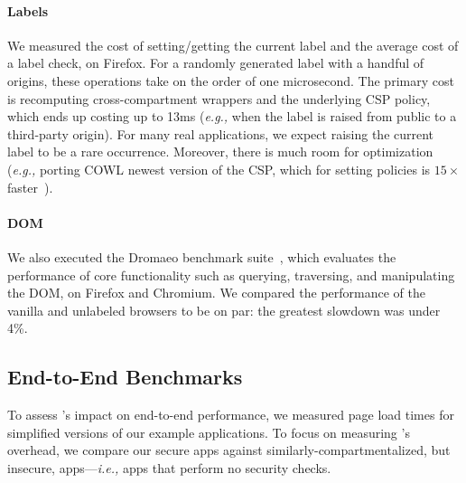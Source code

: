 \paragraph{Labels} We measured the cost of setting/getting the current
label and the average cost of a label check, on Firefox.
%
For a randomly generated label with a handful of origins, these
operations take on the order of one microsecond.
%
The primary cost is recomputing cross-compartment wrappers and
the underlying CSP policy, which ends up costing up to 13ms (\emph{e.g.,} when
the label is raised from public to a third-party origin).
%
For many real applications, we expect raising the current label
to be a rare occurrence.
%
Moreover, there is much room for optimization (\emph{e.g.,}
porting COWL newest version of the CSP, which for
setting policies is $15\times$ faster~\cite{faster-csp}).
 
\paragraph{DOM} We also executed the Dromaeo benchmark suite~\cite{dromaeo},
which evaluates the performance of core functionality such as
querying, traversing, and manipulating the DOM, on Firefox and
Chromium. We compared the performance of the vanilla and unlabeled
browsers to be on par: the greatest slowdown was under 4\%.

\subsection{End-to-End Benchmarks}
\label{sec:eval:macro}

To assess \sys{}'s impact on end-to-end performance, we measured
page load times for simplified versions of our example applications.
%
To focus on measuring \sys{}'s overhead, we compare our secure apps
against similarly-compartmentalized, but insecure, apps---\emph{i.e.,}
apps that perform no security checks.
%

